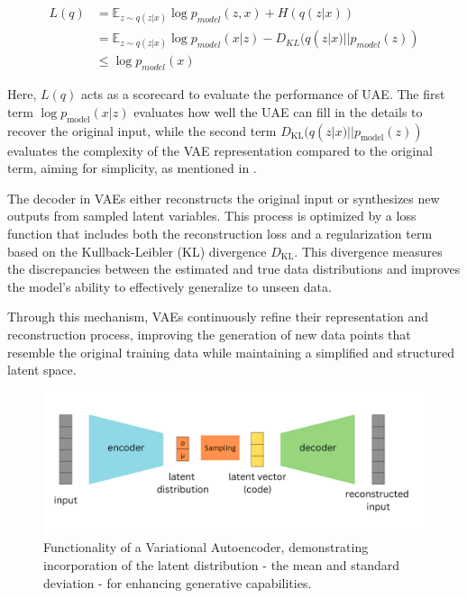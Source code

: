 \begin{align}
  L(q) &= \mathbb{E}_{z \sim q(z|x)} \log p_{model}(z, x) + H(q(z|x)) \\
  &= \mathbb{E}_{z \sim q(z|x)} \log p_{model}(x|z) - D_{KL}(q(z|x) || p_{model}(z)) \\
  &\leq \log p_{model}(x)
\end{align}
        
Here, \( L(q) \) acts as a scorecard to evaluate the performance of UAE. The first term \( \log p_{\text{model}}(x|z) \) evaluates how well the UAE can fill in the details to recover the original input, while the second term \( D_{\text{KL}}(q(z|x) || p_{\text{model}}(z)) \) evaluates the complexity of the VAE representation compared to the original term, aiming for simplicity, as mentioned in \citep{GoodfellowDeepLearning}. 
        
The decoder in VAEs either reconstructs the original input or synthesizes new outputs from sampled latent variables. This process is optimized by a loss function that includes both the reconstruction loss and a regularization term based on the Kullback-Leibler (KL) divergence \( D_{\text{KL}} \). This divergence measures the discrepancies between the estimated and true data distributions \citep{kingmaVAE} and improves the model's ability to effectively generalize to unseen data.
        
Through this mechanism, VAEs continuously refine their representation and reconstruction process, improving the generation of new data points that resemble the original training data while maintaining a simplified and structured latent space.

\begin{figure}[ht]
    \centering
      \hspace{.8cm}
      \includegraphics[width=.9\columnwidth]{figures/VAE.png}
      \caption{Functionality of a Variational Autoencoder, demonstrating incorporation of the latent distribution - the mean and standard deviation - for enhancing generative capabilities.}
      \label{fig:figureVAE}
\end{figure}

